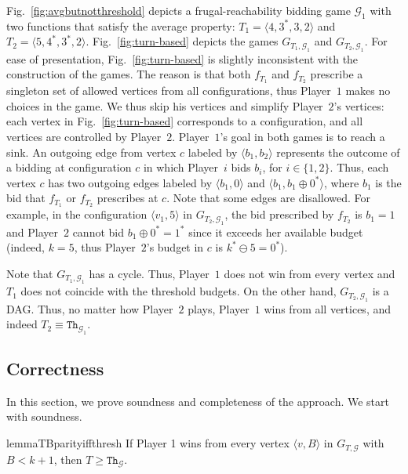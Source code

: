 \documentclass{theoretics}
\newcommand{\PO}{Player~$1$\xspace}
\newcommand{\PT}{Player~$2$\xspace}
\newcommand{\PLi}{Player~$i$\xspace}
\newcommand{\G}{{\mathcal G}}
\newcommand{\thresh}{\texttt{Th}\xspace}
\newcommand{\zug}[1]{\langle #1  \rangle}
\renewcommand{\set}[1]{\{ #1  \}}
\newcommand{\succb}[1]{#1 \oplus 0^*\xspace}
\begin{document}
\begin{example}
Fig.~\ref{fig:avgbutnotthreshold} depicts a frugal-reachability bidding game \(\G_1\) with two functions that satisfy the average property: \(T_1 = \zug{4,3^*, 3, 2}\) and \(T_2 = \zug{5,4^*, 3^*, 2}\). 
Fig.~\ref{fig:turn-based} depicts the games $G_{T_1, \G_1}$ and $G_{T_2, \G_1}$. For ease of presentation, Fig.~\ref{fig:turn-based} is slightly inconsistent with the construction of the games. 
The reason is that both $f_{T_1}$ and $f_{T_2}$ prescribe a singleton set of allowed vertices from all configurations, thus \PO makes no choices in the game. We thus skip his vertices and simplify \PT's vertices: each vertex in Fig.~\ref{fig:turn-based} corresponds to a configuration, and all vertices are controlled by \PT. \PO's goal in both games is to reach a sink.  An outgoing edge from vertex $c$ labeled by $\zug{b_1, b_2}$ represents the outcome of a bidding at configuration $c$ in which \PLi bids $b_i$, for $i \in \set{1,2}$. Thus, each vertex $c$ has two outgoing edges labeled by $\zug{b_1, 0}$ and $\zug{b_1, \succb{b_1}}$, where $b_1$ is the bid that $f_{T_1}$ or $f_{T_2}$ prescribes at $c$. Note that some edges are disallowed. For example, in the configuration $\zug{v_1, 5}$ in $G_{T_2, \G_1}$, the bid prescribed by $f_{T_2}$ is $b_1 = 1$ and \PT cannot bid $\succb{b_1} = 1^*$ since it exceeds her available budget (indeed, $k=5$, thus \PT's budget in $c$ is $k^* \ominus 5 = 0^*$). 

Note that \(G_{T_1, \G_1}\) has a cycle. Thus, \PO does not win from every vertex and $T_1$ does not coincide with the threshold budgets. On the other hand, \(G_{T_2, \G_1}\) is a DAG. Thus, no matter how \PT plays, \PO wins from all vertices, and indeed \(T_2 \equiv \thresh_{\G_1}\).
\end{example}


\subsection{Correctness}
In this section, we prove soundness and completeness of the approach. We start with soundness.


\begin{restatable}{lemma}{TBparityiffthresh}
	\label{lemma:TBparity-iff-thresh}
	If Player 1 wins from every vertex $\zug{v,B}$ in $G_{T, \G}$ with $B < k+1$, then $T \geq \thresh_\G$. 
\end{restatable}
\end{document}
